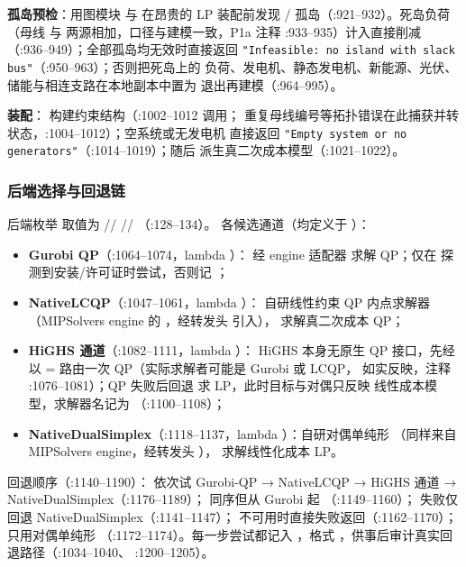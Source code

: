 \textbf{孤岛预检}：用图模块  与
 在昂贵的 LP 装配前发现 /
 孤岛（:921--932）。死岛负荷（母线  与
 两源相加，口径与建模一致，P1a 注释 :933--935）计入直接削减
（:936--949）；全部孤岛均无效时直接返回
\texttt{"Infeasible: no island with slack bus"}（:950--963）；否则把死岛上的
负荷、发电机、静态发电机、新能源、光伏、储能与相连支路在本地副本中置为
退出再建模（:964--995）。

\textbf{装配}： 构建约束结构（:1002--1012 调用；
重复母线编号等拓扑错误在此捕获并转状态，:1004--1012）；空系统或无发电机
直接返回 \texttt{"Empty system or no generators"}（:1014--1019）；随后
 派生真二次成本模型（:1021--1022）。

\subsubsection*{后端选择与回退链}
后端枚举  取值为 //
//
（:128--134）。
各候选通道（均定义于 ）：
\begin{itemize}
  \item \textbf{Gurobi QP}（:1064--1074，lambda ）：
        经 engine 适配器  求解 QP；仅在
         探测到安装/许可证时尝试，否则记
        ；
  \item \textbf{NativeLCQP}（:1047--1061，lambda ）：
        自研线性约束 QP 内点求解器（MIPSolvers engine 的
        ，经转发头
         引入），
        求解真二次成本 QP；
  \item \textbf{HiGHS 通道}（:1082--1111，lambda ）：
        HiGHS 本身无原生 QP 接口，先经  以
        = 路由一次 QP（实际求解者可能是
        Gurobi 或 LCQP， 如实反映，注释 :1076--1081）；QP
        失败后回退  求 LP，此时目标与对偶只反映
        线性成本模型，求解器名记为 
        （:1100--1108）；
  \item \textbf{NativeDualSimplex}（:1118--1137，lambda
        ）：自研对偶单纯形
        （同样来自 MIPSolvers engine，经转发头
        ），
        求解线性化成本 LP。
\end{itemize}
回退顺序（:1140--1190）： 依次试 Gurobi-QP → NativeLCQP → HiGHS
通道 → NativeDualSimplex（:1176--1189）； 同序但从 Gurobi 起
（:1149--1160）； 失败仅回退 NativeDualSimplex（:1141--1147）；
 不可用时直接失败返回（:1162--1170）； 只用对偶单纯形
（:1172--1174）。每一步尝试都记入 ，格式
，供事后审计真实回退路径（:1034--1040、
:1200--1205）。

